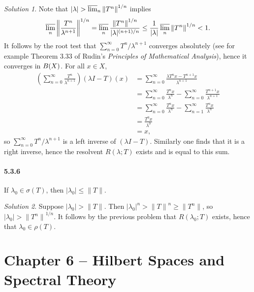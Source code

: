 \documentclass{report}
\newcommand{\norm}[1]{{\lVert #1 \rVert}}
\newcommand{\snorm}[1]{\left\lVert #1 \right\rVert}
\let\sc\relax
\newcommand{\sc}[1]{\mathscr{#1}}
\theoremstyle{remark}
\newtheorem*{solution}{Solution}
\begin{document}
\begin{solution}
  Note that $|\lambda| > \varlimsup_n \norm{T^n}^{1/n}$ implies
  \begin{equation*}
    \varlimsup_n \snorm{\frac{T^n}{\lambda^{n+1}}}^{1/n} = \varlimsup_n \frac{\norm{T^n}^{1/n}}{|\lambda|^{(n+1)/n}} \le \frac{1}{|\lambda|} \varlimsup_n \norm{T^n}^{1/n} < 1.
  \end{equation*}
  It follows by the root test that $\sum_{n=0}^\infty T^n/\lambda^{n+1}$ converges absolutely (see for example Theorem 3.33 of Rudin's \emph{Principles of Mathematical Analysis}), hence it converges in $\sc B(X)$. For all $x \in X$,
  \begin{equation*}
    \begin{split}
      \left( \sum_{n=0}^\infty \frac{T^n}{\lambda^{n+1}} \right) (\lambda I - T)(x) &= \sum_{n=0}^\infty \frac{\lambda T^n x - T^{n+1}x}{\lambda^{n+1}} \\
      &= \sum_{n=0}^\infty \frac{T^n x}{\lambda^n} - \sum_{n=0}^\infty \frac{T^{n+1}x}{\lambda^{n+1}} \\
      &= \sum_{n=0}^\infty \frac{T^n x}{\lambda^n} - \sum_{n=1}^\infty \frac{T^n x}{\lambda^n} \\
      &= \frac{T^0 x}{\lambda^0} \\
      &= x,
    \end{split}
  \end{equation*}
  so $\sum_{n=0}^\infty T^n/\lambda^{n+1}$ is a left inverse of $(\lambda I - T)$. Similarly one finds that it is a right inverse, hence the resolvent $R(\lambda; T)$ exists and is equal to this sum.
\end{solution}

\subsubsection*{5.3.6}
If $\lambda_0 \in \sigma(T)$, then $|\lambda_0| \le \norm{T}$.

\begin{solution}
  Suppose $|\lambda_0| > \norm T$. Then $|\lambda_0|^n > \norm T^n \ge \norm{T^n}$, so $|\lambda_0| > \norm{T^n}^{1/n}$. It follows by the previous problem that $R(\lambda_0; T)$ exists, hence that $\lambda_0 \in \rho(T)$.
\end{solution}

\chapter*{Chapter 6 -- Hilbert Spaces and Spectral Theory}
\end{document}
